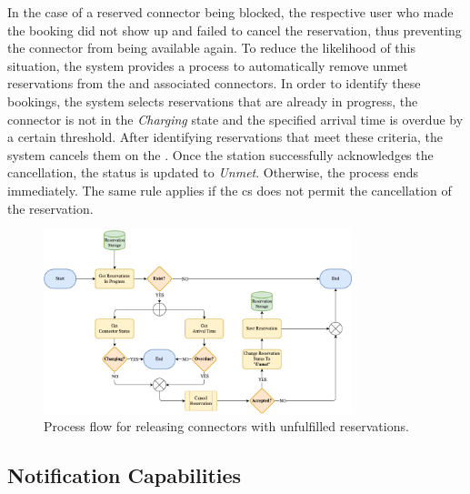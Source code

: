 In the case of a reserved connector being blocked, the respective user who made the booking did not show up and failed to cancel the reservation, thus preventing the connector from being available again.
To reduce the likelihood of this situation, the system provides a process to automatically remove unmet reservations from the  and associated connectors.
In order to identify these bookings, the system selects reservations that are already in progress, the connector is not in the \textit{Charging} state and the specified arrival time is overdue by a certain threshold.
After identifying reservations that meet these criteria, the system cancels them on the . Once the station successfully acknowledges the cancellation, the status is updated to \textit{Unmet}.
Otherwise, the process ends immediately. The same rule applies if the \acrshort{cs} does not permit the cancellation of the reservation.

\begin{figure}[h]
    \centering
    \includegraphics[width=0.8\textwidth,keepaspectratio]{resources/images/main/5_design/processes/scheduler/CancelUnmetReservation.png}
    \caption{Process flow for releasing connectors with unfulfilled reservations.}
    \label{fig:free-connector-flowchart}
\end{figure}

\newpage

\subsection{Notification Capabilities}
\label{ch:Design:sec:Reservation System:ssec:Notification Capabilities}

